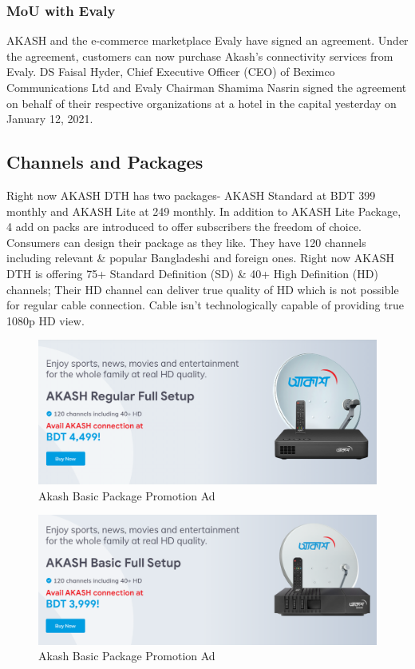 \begin{spacing}{1.0}
\subsubsection{MoU with Evaly}
AKASH and the e-commerce marketplace Evaly have signed an agreement. Under the agreement, customers can now purchase Akash's connectivity services from Evaly. DS Faisal Hyder, Chief Executive Officer (CEO) of Beximco Communications Ltd and Evaly Chairman Shamima Nasrin signed the agreement on behalf of their respective organizations at a hotel in the capital yesterday on January 12, 2021.
\subsection{Channels and Packages}
Right now AKASH DTH has two packages- AKASH Standard at BDT 399 monthly and AKASH Lite at 249 monthly. In addition to AKASH Lite Package, 4 add on packs are introduced to offer subscribers the freedom of choice. Consumers can design their package as they like.
They have 120 channels including relevant \& popular Bangladeshi and foreign ones. 
Right now AKASH DTH is offering 75+ Standard Definition (SD) \& 40+ High Definition (HD) channels; Their HD channel can deliver true quality of HD which is not possible for regular cable connection. Cable isn't technologically capable of providing true 1080p HD view. 
\begin{figure}[H]
	\centering
	\includegraphics[width=\textwidth]{package1}
	\caption{Akash Basic Package Promotion Ad}
	\label{fig:package1}
\end{figure}

\begin{figure}[H]
	\centering
	\includegraphics[width=\textwidth]{package2}
	\caption{Akash Basic Package Promotion Ad}
	\label{fig:package2}
\end{figure}


\end{spacing}
